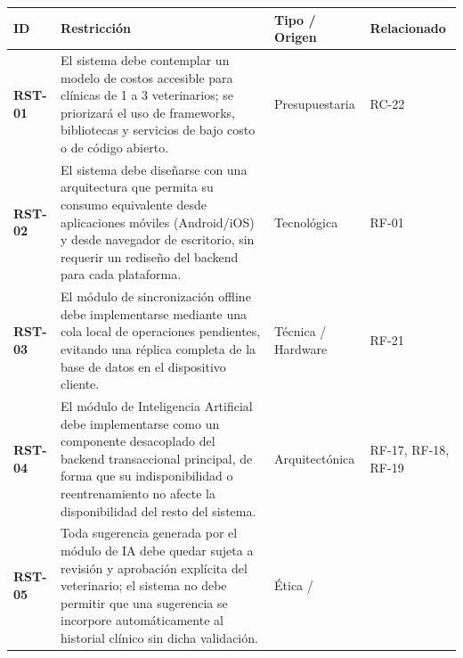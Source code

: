 {\def\LTcaptype{none} %
\begin{longtable}[]{@{}
  >{\raggedright\arraybackslash}p{}
  >{\raggedright\arraybackslash}p{}
  >{\raggedright\arraybackslash}p{}
  >{\raggedright\arraybackslash}p{}@{}}
\toprule\noalign{}
\begin{minipage}[b]{\linewidth}\raggedright
\textbf{ID}
\end{minipage} & \begin{minipage}[b]{\linewidth}\raggedright
\textbf{Restricción}
\end{minipage} & \begin{minipage}[b]{\linewidth}\raggedright
\textbf{Tipo / Origen}
\end{minipage} & \begin{minipage}[b]{\linewidth}\raggedright
\textbf{Relacionado}
\end{minipage} \\
\midrule\noalign{}
\endhead
\bottomrule\noalign{}
\endlastfoot
\textbf{RST-01} & El sistema debe contemplar un modelo de costos
accesible para clínicas de 1 a 3 veterinarios; se priorizará el uso de
frameworks, bibliotecas y servicios de bajo costo o de código abierto. & Presupuestaria & RC-22 \\
\textbf{RST-02} & El sistema debe diseñarse con una arquitectura que
permita su consumo equivalente desde aplicaciones móviles (Android/iOS)
y desde navegador de escritorio, sin requerir un rediseño del backend para cada plataforma. & Tecnológica & RF-01 \\
\textbf{RST-03} & El módulo de sincronización offline debe implementarse
mediante una cola local de operaciones pendientes, evitando una réplica
completa de la base de datos en el dispositivo cliente. & Técnica / Hardware & RF-21 \\
\textbf{RST-04} & El módulo de Inteligencia Artificial debe
implementarse como un componente desacoplado del backend transaccional principal, de forma que su indisponibilidad o reentrenamiento no afecte
la disponibilidad del resto del sistema. & Arquitectónica & RF-17,
RF-18, RF-19 \\
\textbf{RST-05} & Toda sugerencia generada por el módulo de IA debe
quedar sujeta a revisión y aprobación explícita del veterinario; el
sistema no debe permitir que una sugerencia se incorpore automáticamente al historial clínico sin dicha validación. & Ética /


\end{longtable}}
